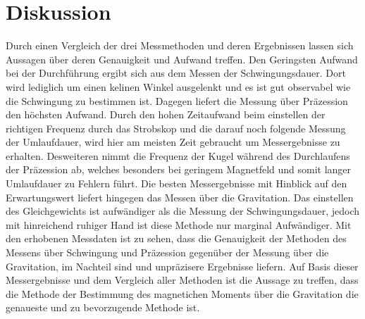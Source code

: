 \section{Diskussion}
\label{sec:Diskussion}
Durch einen Vergleich der drei Messmethoden und deren Ergebnissen lassen sich Aussagen über deren Genauigkeit und Aufwand treffen.
Den Geringsten Aufwand bei der Durchführung ergibt sich aus dem Messen der Schwingungsdauer. 
Dort wird lediglich um einen kelinen Winkel ausgelenkt und es ist gut observabel wie die Schwingung zu bestimmen ist.
Dagegen liefert die Messung über Präzession den höchsten Aufwand. 
Durch den hohen Zeitaufwand beim einstellen der richtigen Frequenz durch das Strobskop und die darauf noch folgende Messung der Umlaufdauer,
wird hier am meisten Zeit gebraucht um Messergebnisse zu erhalten. 
Desweiteren nimmt die Frequenz der Kugel während des Durchlaufens der Präzession ab, welches besonders bei geringem Magnetfeld und somit langer Umlaufdauer zu Fehlern führt.
Die besten Messergebnisse mit Hinblick auf den Erwartungswert liefert hingegen das Messen über die Gravitation. 
Das einstellen des Gleichgewichts ist aufwändiger als die Messung der Schwingungsdauer, jedoch mit hinreichend ruhiger Hand ist diese Methode nur marginal Aufwändiger.
Mit den erhobenen Messdaten ist zu sehen, dass die Genauigkeit der Methoden des Messens über Schwingung und Präzession gegenüber der Messung über die Gravitation, im Nachteil sind
und unpräzisere Ergebnisse liefern.
Auf Basis dieser Messergebnisse und dem Vergleich aller Methoden ist die Aussage zu treffen,
dass die Methode der Bestimmung des magnetichen Moments über die Gravitation die genaueste und zu bevorzugende Methode ist.